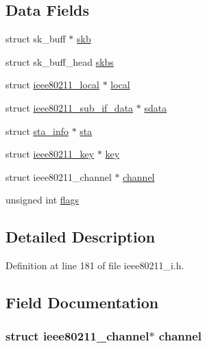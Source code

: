 \subsection*{Data Fields}
\begin{DoxyCompactItemize}
\item 
struct sk\-\_\-buff $\ast$ \hyperlink{structieee80211__tx__data_aeba6836824708325a83121030f092c30}{skb}
\item 
struct sk\-\_\-buff\-\_\-head \hyperlink{structieee80211__tx__data_aad317933678d4ee97c8e47099a46dadc}{skbs}
\item 
struct \hyperlink{structieee80211__local}{ieee80211\-\_\-local} $\ast$ \hyperlink{structieee80211__tx__data_ad436a024f420f219c4fe2eebce7e4ab2}{local}
\item 
struct \hyperlink{structieee80211__sub__if__data}{ieee80211\-\_\-sub\-\_\-if\-\_\-data} $\ast$ \hyperlink{structieee80211__tx__data_ad829d8d33f06a7245cc303f924f259ac}{sdata}
\item 
struct \hyperlink{structsta__info}{sta\-\_\-info} $\ast$ \hyperlink{structieee80211__tx__data_aafa9dadbeccd54b4a6b9f77f2908a093}{sta}
\item 
struct \hyperlink{structieee80211__key}{ieee80211\-\_\-key} $\ast$ \hyperlink{structieee80211__tx__data_a6fb9dce4966e6727c301a63b8185c388}{key}
\item 
struct ieee80211\-\_\-channel $\ast$ \hyperlink{structieee80211__tx__data_a80252eb32e874a054a819044989184e2}{channel}
\item 
unsigned int \hyperlink{structieee80211__tx__data_ac92588540e8c1d014a08cd8a45462b19}{flags}
\end{DoxyCompactItemize}


\subsection{Detailed Description}


Definition at line 181 of file ieee80211\-\_\-i.\-h.



\subsection{Field Documentation}
\hypertarget{structieee80211__tx__data_a80252eb32e874a054a819044989184e2}{
\subsubsection[{channel}]{\setlength{\rightskip}{0pt plus 5cm}struct ieee80211\-\_\-channel$\ast$ channel}}\label{structieee80211__tx__data_a80252eb32e874a054a819044989184e2}


